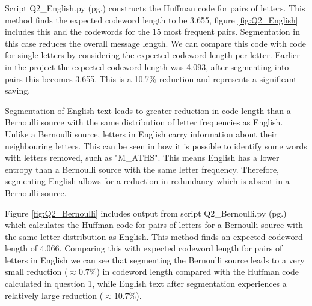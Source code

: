 \documentclass[a4paper]{article}
\begin{document}
\bigskip
Script Q2\_English.py (pg.\pageref{PQ2_English}) constructs the Huffman code for pairs of letters. This method finds the expected codeword length to be 3.655, figure \ref{fig:Q2_English} includes this and the codewords for the 15 most frequent pairs. Segmentation in this case reduces the overall message length. We can compare this code with code for single letters by considering the expected codeword length per letter. Earlier in the project the expected codeword length was 4.093, after segmenting into pairs this becomes 3.655. This is a 10.7\% reduction and represents a significant saving.

\bigskip
Segmentation of English text leads to greater reduction in code length than a Bernoulli source with the same distribution of letter frequencies as English. Unlike a Bernoulli source, letters in English carry information about their neighbouring letters. This can be seen in how it is possible to identify some words with letters removed, such as "M\_ATHS". This means English has a lower entropy than a Bernoulli source with the same letter frequency. Therefore, segmenting English allows for a reduction in redundancy which is absent in a Bernoulli source.


\bigskip
Figure \ref{fig:Q2_Bernoulli} includes output from script Q2\_Bernoulli.py (pg.\pageref{fig:Q2_Bernoulli}) which calculates the Huffman code for pairs of letters for a Bernoulli source with the same letter distribution as English. This method finds an expected codeword length of 4.066. Comparing this with expected codeword length for pairs of letters in English we can see that segmenting the Bernoulli source leads to a very small reduction ($\approx 0.7\%$) in codeword length compared with the Huffman code calculated in question 1, while English text after segmentation experiences a relatively large reduction ($\approx 10.7\%$).
\end{document}
